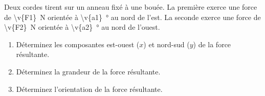 Deux cordes tirent sur un anneau fixé à une bouée. La première exerce une force de \qty{\v{F1}}{N} orientée à \qty{\v{a1}}{\degree} au nord de l'est. La seconde exerce une force de \qty{\v{F2}}{N} orientée à \qty{\v{a2}}{\degree} au nord de l'ouest.

\begin{enumerate}[label=\alph*)]
    \item Déterminez les composantes est-ouest ($x$) et nord-sud ($y$) de la force résultante.
    \item Déterminez la grandeur de la force résultante.
    \item Déterminez l'orientation de la force résultante.
\end{enumerate}
